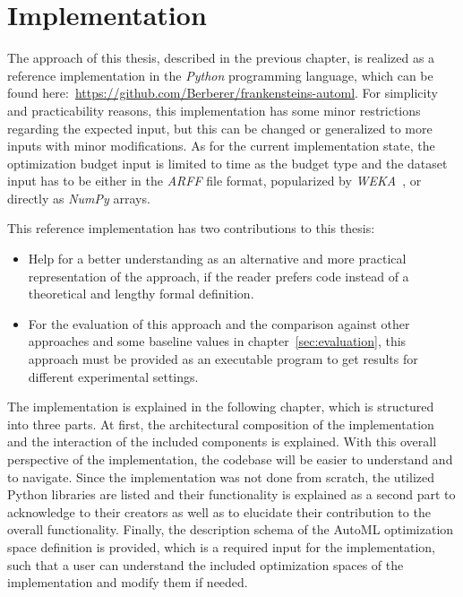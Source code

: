 %
\chapter{Implementation}
\label{sec:implementation}
The approach of this thesis, described in the previous chapter, is realized as a reference implementation in the \textit{Python} programming language, which can be found here:~\url{https://github.com/Berberer/frankensteins-automl}.\newline
For simplicity and practicability reasons, this implementation has some minor restrictions regarding the expected input, but this can be changed or generalized to more inputs with minor modifications.
As for the current implementation state, the optimization budget input is limited to time as the budget type and the dataset input has to be either in the \textit{ARFF} file format, popularized by \textit{WEKA}~\cite{Witten-Weka}, or directly as \textit{NumPy} arrays.

This reference implementation has two contributions to this thesis:
\begin{itemize}
	\item Help for a better understanding as an alternative and more practical representation of the approach, if the reader prefers code instead of a theoretical and lengthy formal definition.
	\item For the evaluation of this approach and the comparison against other approaches and some baseline values in chapter~\ref{sec:evaluation}, this approach must be provided as an executable program to get results for different experimental settings.
\end{itemize}

The implementation is explained in the following chapter, which is structured into three parts.
At first, the architectural composition of the implementation and the interaction of the included components is explained.
With this overall perspective of the implementation, the codebase will be easier to understand and to navigate.
Since the implementation was not done from scratch, the utilized Python libraries are listed and their functionality is explained as a second part to acknowledge to their creators as well as to elucidate their contribution to the overall functionality.
Finally, the description schema of the AutoML optimization space definition is provided, which is a required input for the implementation, such that a user can understand the included optimization spaces of the implementation and modify them if needed.

